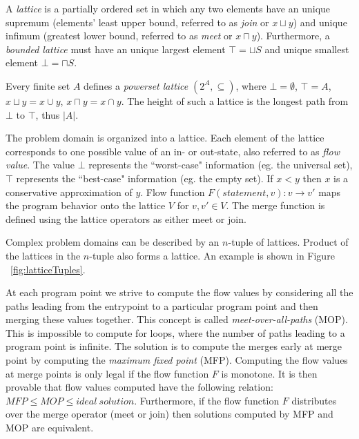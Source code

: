 \begin{definition}
A \emph{lattice} is a partially ordered set in which any two elements have an unique supremum (elements' least upper bound, referred to as \emph{join} or $x \sqcup y$) and unique infimum (greatest lower bound, referred to as \emph{meet} or $x \sqcap y$). Furthermore, a \emph{bounded lattice} must have an unique largest element $\top = \sqcup S$ and unique smallest element $\bot = \sqcap S$.
\end{definition}

\begin{definition}
Every finite set $A$ defines a \emph{powerset lattice} $(2^A, \subseteq)$, where $\bot = \emptyset$, $\top = A$, $x \sqcup y = x \cup y$, $x \sqcap y = x \cap y$. The height of such a lattice is the longest path from $\bot$ to $\top$, thus $|A|$.
\end{definition}

The problem domain is organized into a lattice. Each element of  the lattice corresponds to one possible value of an in- or out-state, also referred to as \emph{flow value}. The value $\bot$ represents the ``worst-case" information (eg. the universal set), $\top$ represents the ``best-case" information (eg. the empty set). If $x < y$ then $x$ is a conservative approximation of $y$. Flow function $F(statement, v): v \rightarrow v'$  maps the program behavior onto the lattice $V$ for $v, v' \in V$. The merge function is defined using the lattice operators as either meet or join.

Complex problem domains can be described by an $n$-tuple of lattices. Product of the lattices in the $n$-tuple also forms a lattice. An example is shown in Figure ~\ref{fig:latticeTuples}.

At each program point we strive to compute the flow values by considering all the paths leading from the entrypoint to a particular program point and then merging these values together. This concept is called \emph{meet-over-all-paths} (MOP). This is impossible to compute for loops, where the number of paths leading to a program point is infinite. The solution is to compute the merges early at merge point by computing the \emph{maximum fixed point} (MFP). Computing the flow values at merge points is only legal if the flow function $F$ is monotone. It is then provable that flow values computed have the following relation: $MFP \leq MOP \leq ideal\ solution$. Furthermore, if the flow function $F$ distributes over the merge operator (meet or join) then solutions computed by MFP and MOP are equivalent.

